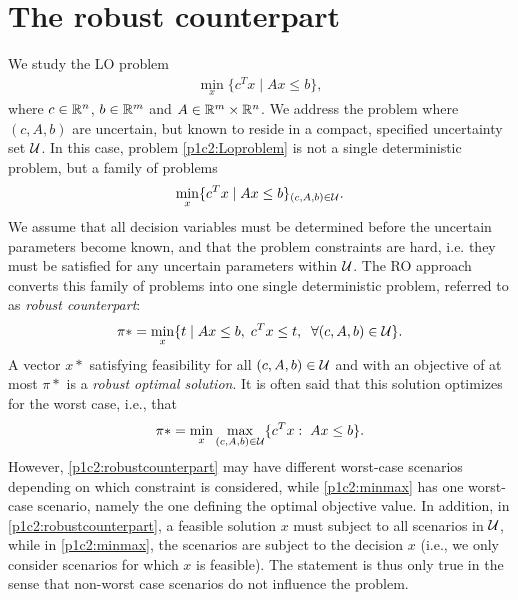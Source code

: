 \section{The robust counterpart}

We study the LO problem
\begin{align}\label{p1c2:Loproblem}
	\min\limits_x\{c^Tx\mid Ax\leq b\},
\end{align}
where $c\in\mathbb{R}^n$, $b\in\mathbb{R}^m$ and $A\in\mathbb{R}^m\times\mathbb{R}^n$. We address the problem where $(c,A,b)$ are uncertain, but known to reside in a compact, specified uncertainty set $\mathcal{U}$. In this case, problem \eqref{p1c2:Loproblem} is not a single deterministic problem, but a family of problems
\begin{align}
	\min\limits_x\{c^Tx\mid Ax\leq b\}_{(c,A,b)\in\mathcal{U}}.
\end{align}
We assume that all decision variables must be determined before the uncertain parameters become known, and that the problem constraints are hard, i.e. they must be satisfied for any uncertain parameters within $\mathcal{U}$. The RO approach converts this family of problems into one single deterministic problem, referred to as \textit{robust counterpart}:
\begin{align}\label{p1c2:robustcounterpart}
	\pi* = \min\limits_x \{t \mid Ax\leq b,\;c^Tx\leq t,\;\;\forall (c,A,b)\in\mathcal{U}\}.
\end{align}
A vector $x*$ satisfying feasibility for all $(c,A,b)\in\mathcal{U}$ and with an objective of at most $\pi*$ is a \textit{robust optimal solution}. It is often said that this solution optimizes for the worst case, i.e., that
\begin{align*}\label{p1c2:minmax}
\pi* = \min\limits_x \max\limits_{(c,A,b)\in\mathcal{U}} \{c^T x:\;Ax\leq b\}.
\end{align*}
However, \eqref{p1c2:robustcounterpart} may have different worst-case scenarios depending on which constraint is considered, while \eqref{p1c2:minmax} has one worst-case scenario, namely the one defining the optimal objective value. In addition, in \eqref{p1c2:robustcounterpart}, a feasible solution $x$ must subject to all scenarios in $\mathcal{U}$, while in \eqref{p1c2:minmax}, the scenarios are subject to the decision $x$ (i.e., we only consider scenarios for which $x$ is feasible). The statement is thus only true in the sense that non-worst case scenarios do not influence the problem. 

